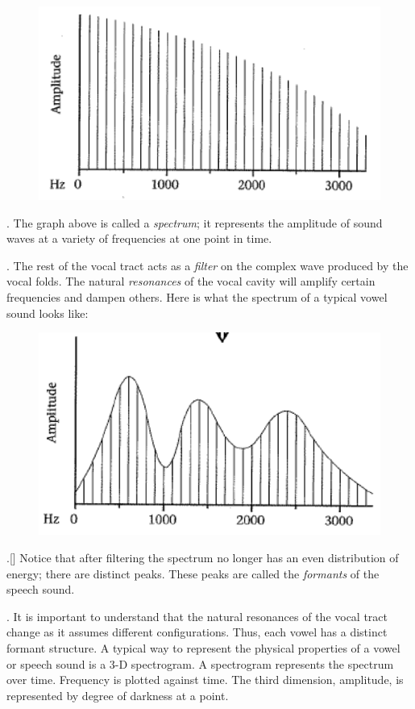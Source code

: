 \documentclass[11pt, oneside]{article}   	%
\begin{document}
\begin{figure}[h!]
\centering
\includegraphics{amplitude}
\end{figure}

\ex. The graph above is called a {\itshape spectrum}; it represents the amplitude of sound waves at a variety of frequencies at one point in time.

\ex. The rest of the vocal tract acts as a {\itshape filter} on the complex wave produced by the vocal folds.  The natural {\itshape resonances} of the vocal cavity will amplify certain frequencies and dampen others.  Here is what the spectrum of a typical vowel sound looks like:

\begin{figure}[h!]
\centering
\includegraphics{resonances}
\end{figure}

\ex.[] Notice that after filtering the spectrum no longer has an even distribution of energy; there are distinct peaks.  These peaks are called the {\itshape formants} of the speech sound.  

\ex. It is important to understand that the natural resonances of the vocal tract change as it assumes different configurations.  Thus, each vowel has a distinct formant structure.  A typical way to represent the physical properties of a vowel or speech sound is a 3-D spectrogram. A spectrogram represents the spectrum over time. Frequency is plotted against time.  The third dimension, amplitude, is represented by degree of darkness at a point.
\end{document}
